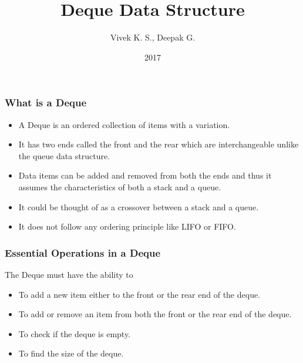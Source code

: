 \documentclass{beamer}
\title{Deque Data Structure}
\author{Vivek K. S., Deepak G.}
\institute{Information Systems Decision Sciences (ISDS)\\
MUMA College of Business\\
University of South Florida \\
Tampa, Florida}
\date{2017}
\begin{document}
 
\frame{\titlepage}
 
\begin{frame}
\frametitle{What is a Deque}
\begin{itemize}

\item A Deque is an ordered collection of items with a variation.

\item It has two ends called the front and the rear which are interchangeable unlike the queue data structure.

\item Data items can be added and removed from both the ends and thus it assumes the characteristics of both a stack and a queue. 

\item It could be thought of as a crossover between a stack and a queue.

\item It does not follow any ordering principle like LIFO or FIFO.


\end{itemize}
\end{frame}


\begin{frame}
\frametitle{Essential Operations in a Deque}
The Deque must have the ability to
\begin{itemize}

\item To add a new item either to the front or the rear end of the deque.

\item To add or remove an item from both the front or the rear end of the deque.

\item To check if the deque is empty.

\item To find the size of the deque.

\end{itemize}
\end{frame}
\end{document}
